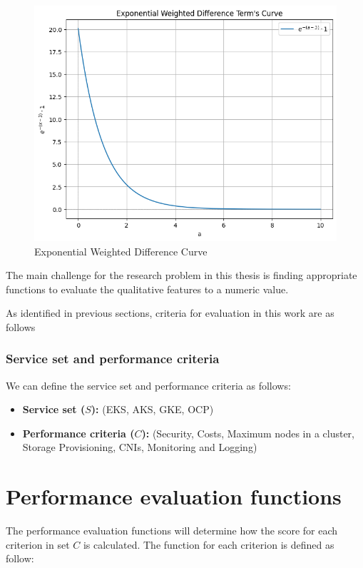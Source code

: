 \begin{figure}
    \centering
    \includegraphics[width=0.75\linewidth]{resources/example exponential function.png}
    \caption{Exponential Weighted Difference Curve}
    \label{fig:example-exp-func-graph}
\end{figure}

The main challenge for the research problem in this thesis is finding
appropriate functions to evaluate the qualitative features to a numeric
value.

As identified in previous sections, criteria for evaluation in this work
are as follows

\subsubsection{Service set and performance
criteria}\label{service-set-and-performance-criteria}

We can define the service set and performance criteria as follows:

\begin{itemize}
\tightlist
\item
  \textbf{Service set (\(S\)):} (EKS, AKS, GKE, OCP)
\item
  \textbf{Performance criteria (\(C\)):} (Security, Costs, Maximum nodes
  in a cluster, Storage Provisioning, CNIs, Monitoring and Logging)
\end{itemize}

\section{Performance evaluation
functions}\label{performance-evaluation-functions}

The performance evaluation functions will determine how the score for
each criterion in set \(C\) is calculated. The function for each
criterion is defined as follow:

